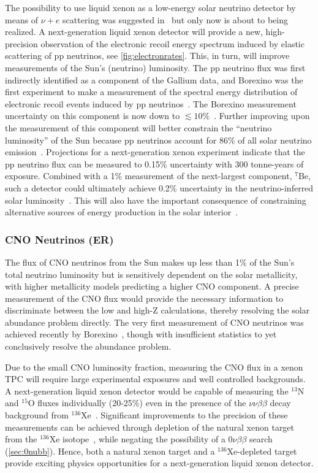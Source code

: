 The possibility to use liquid xenon as a low-energy solar neutrino detector by means of $\nu + e$ scattering was suggested in~\cite{Suzuki:2000ch} but only now is about to being realized. A next-generation liquid xenon detector will provide a new, high-precision observation of the electronic recoil energy spectrum induced by elastic scattering of pp neutrinos, see \autoref{fig:electronrates}. This, in turn, will improve measurements of the Sun's (neutrino) luminosity. The pp neutrino flux was first indirectly identified as a component of the Gallium data, and Borexino was the first experiment to make a measurement of the spectral energy distribution of electronic recoil events induced by pp neutrinos~\cite{Smirnov:2015lxy}. The Borexino measurement uncertainty on this component is now down to $\lesssim 10\%$~\cite{Agostini:2018uly}. Further improving upon the measurement of this component will better constrain the ``neutrino luminosity'' of the Sun because pp neutrinos account for 86\% of all solar neutrino emission~\cite{Bahcall:2001pf}. Projections for a next-generation xenon experiment indicate that the pp neutrino flux can be measured to 0.15\% uncertainty with 300 tonne-years of exposure. Combined with a 1\% measurement of the next-largest component, $^7$Be, such a detector could ultimately achieve 0.2\% uncertainty in the neutrino-inferred solar luminosity~\cite{Aalbers:2020gsn}. This will also have the important consequence of constraining alternative sources of energy production in the solar interior~\cite{Newstead:2018muu}. 

\subsubsection{CNO Neutrinos (ER)}\label{sec:cno}

The flux of CNO neutrinos from the Sun makes up less than 1\% of the Sun's total neutrino luminosity but is sensitively dependent on the solar metallicity, with higher metallicity models predicting a higher CNO component. A precise measurement of the CNO flux would provide the necessary information to discriminate between the low and high-Z calculations, thereby resolving the solar abundance problem directly. The very first measurement of CNO neutrinos was achieved recently by Borexino~\cite{Agostini:2020mfq}, though with insufficient statistics to yet conclusively resolve the abundance problem. 

Due to the small CNO luminosity fraction, measuring the CNO flux in a xenon TPC will require large experimental exposures and well controlled backgrounds. A next-generation liquid xenon detector would be capable of measuring the $^{13}$N and $^{15}$O fluxes individually (20-25\%) even in the presence of the $\nu\nu\beta\beta$ decay background from $^{136}$Xe~\cite{Aalbers:2020gsn}. Significant improvements to the precision of these measurements can be achieved through depletion of the natural xenon target from the $^{136}$Xe isotope~\cite{Newstead:2018muu}, while negating the possibility of a $0\nu\beta\beta$ search (\autoref{sec:0nubb}). Hence, both a natural xenon target and a $^{136}$Xe-depleted target provide exciting physics opportunities for a next-generation liquid xenon detector.

